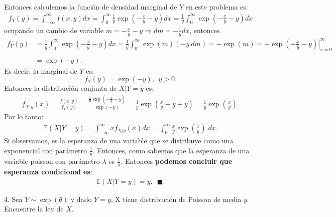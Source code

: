 \documentclass[11pt,letterpaper]{article}
\newcommand{\mE}{\mathbb{E}}
\newcommand{\finf}{\blacksquare.}
\begin{document}
Entonces calculemos la función de densidad marginal de $Y$ en este problema es:
\begin{align*}
f_Y(y)=\int_{-\infty}^\infty f(x,y)dx=\int_{0}^\infty  \frac{1}{y}\exp \left(-\frac{x}{y}-y \right)dx=\frac{1}{y}\int_{0}^\infty \exp \left(-\frac{x}{y}-y \right)dx
\end{align*}
ocupando un cambio de variable $m=-\frac{x}{y}-y\Rightarrow dm=-\frac{1}{y}dx$, entonces
\begin{align*}
f_Y(y)&=\frac{1}{y}\int_{0}^\infty \exp \left(-\frac{x}{y}-y \right)dx=\frac{1}{y}\int_{0}^\infty \exp \left(m \right)(-y\ dm)=-\exp(m)=-\exp\left.\left(-\frac{x}{y}-y\right)\right|_{x=0}^\infty\\ \\ 
&=\exp(-y).
\end{align*}
Es decir, la marginal de $Y$ es:
$$f_Y(y)=\exp(-y), \ \ y>0.$$
Entonces la distribución conjunta de $X|Y=y$ es:
\begin{align*}
f_{X|y}(x)=\frac{f(x,y)}{f_Y(y)}=\frac{\frac{1}{y}\exp\left(-\frac{x}{y}-y \right) }{\exp(-y)}=\frac{1}{y}\exp\left(\frac{x}{y}-y +y\right)=\frac{1}{y}\exp\left(\frac{x}{y}\right).
\end{align*}
Por lo tanto:
\begin{align*}
\mE(X|Y=y) =\int_{-\infty}^\infty x f_{X|y}(x)dx=\int_{0}^\infty \frac{x}{y}\exp\left(\frac{x}{y}\right). dx.
\end{align*}
Si observamos, es la esperanza de una variable que se distribuye como una exponencial con parámetro $\frac{1}{y}.$ Entonces, como sabemos que la esperanza de una variable poisson con parámetro $\lambda$ es $\frac{1}{\lambda}.$ Entonces \textbf{podemos concluir que esperanza condicional es}:
\begin{align*}
\mE(X|Y=y)= y.\ \ \ \finf
\end{align*}


4. Sea $Y\sim \exp(\theta)$ y dado $Y=y$, X tiene distribución de Poisson de media $y$. Encuentre la ley de $X$.
\end{document}
